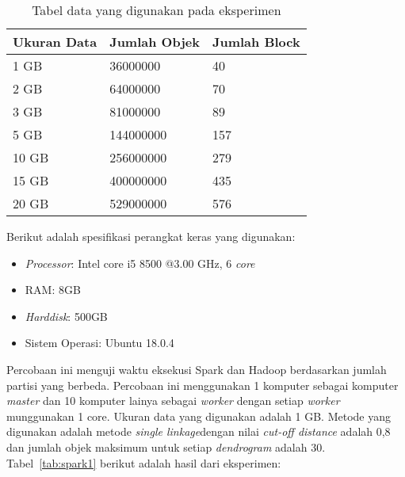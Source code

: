 \begin{table}[H] 
	\centering 
	\caption{Tabel data yang digunakan pada eksperimen}
	\label{tab:exdata}
	\begin{tabular}{|p{2cm}|p{3cm}|p{4cm}|}
\hline
Ukuran Data & Jumlah Objek  & Jumlah Block\\
\hline
1 GB & 36000000 & 40 \\
\hline
2 GB & 64000000 & 70 \\
\hline
3 GB & 81000000 & 89 \\
\hline
5 GB & 144000000 & 157 \\
\hline
10 GB & 256000000 & 279 \\
\hline
15 GB & 400000000 & 435 \\
\hline
20 GB & 529000000 & 576 \\
\hline
	\end{tabular} 
\end{table}



Berikut adalah spesifikasi perangkat keras yang digunakan:

\begin{itemize}

\item \textit{Processor}: Intel core i5 8500 @3.00 GHz, 6 \textit{core}

\item RAM: 8GB

\item \textit{Harddisk}: 500GB

\item Sistem Operasi: Ubuntu 18.0.4

\end{itemize}








Percobaan ini menguji waktu eksekusi Spark dan Hadoop berdasarkan jumlah partisi yang berbeda. Percobaan ini menggunakan 1 komputer sebagai komputer \textit{master} dan 10 komputer lainya sebagai \textit{worker} dengan setiap \textit{worker} munggunakan 1 core. Ukuran data yang digunakan adalah 1 GB. Metode yang digunakan adalah metode \textit{single linkage}dengan nilai \textit{cut-off distance} adalah 0,8 dan jumlah objek maksimum untuk setiap \textit{dendrogram} adalah 30. Tabel~\ref{tab:spark1} berikut adalah hasil dari eksperimen:


